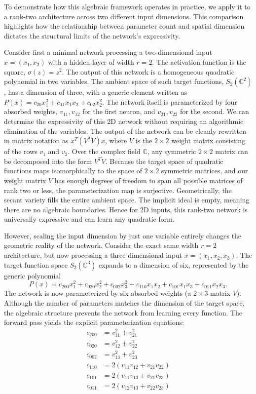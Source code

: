 To demonstrate how this algebraic framework operates in practice, we apply it to a rank-two architecture across two different input dimensions. This comparison highlights how the relationship between parameter count and spatial dimension dictates the structural limits of the network's expressivity.

Consider first a minimal network processing a two-dimensional input $x = (x_1, x_2)$ with a hidden layer of width $r=2$. The activation function is the square, $\sigma(z) = z^2$. The output of this network is a homogeneous quadratic polynomial in two variables. The ambient space of such target functions, $S_2(\mathbb{C}^2)$, has a dimension of three, with a generic element written as $P(x) = c_{20}x_1^2 + c_{11}x_1x_2 + c_{02}x_2^2$. The network itself is parameterized by four absorbed weights, $v_{11}, v_{12}$ for the first neuron, and $v_{21}, v_{22}$ for the second. We can determine the expressivity of this 2D network without requiring an algorithmic elimination of the variables. The output of the network can be cleanly rewritten in matrix notation as $x^T (V^T V) x$, where $V$ is the $2 \times 2$ weight matrix consisting of the rows $v_1$ and $v_2$. Over the complex field $\mathbb{C}$, any symmetric $2 \times 2$ matrix can be decomposed into the form $V^T V$. Because the target space of quadratic functions maps isomorphically to the space of $2 \times 2$ symmetric matrices, and our weight matrix $V$ has enough degrees of freedom to span all possible matrices of rank two or less, the parameterization map is surjective. Geometrically, the secant variety fills the entire ambient space. The implicit ideal is empty, meaning there are no algebraic boundaries. Hence for 2D inputs, this rank-two network is universally expressive and can learn any quadratic form.

However, scaling the input dimension by just one variable entirely changes the geometric reality of the network. Consider the exact same width $r=2$ architecture, but now processing a three-dimensional input $x = (x_1, x_2, x_3)$. The target function space $S_2(\mathbb{C}^3)$ expands to a dimension of six, represented by the generic polynomial
\[
P(x) = c_{200}x_1^2 + c_{020}x_2^2 + c_{002}x_3^2 + c_{110}x_1x_2 + c_{101}x_1x_3 + c_{011}x_2x_3.
\]
The network is now parameterized by six absorbed weights (a $2 \times 3$ matrix $V$). Although the number of parameters matches the dimension of the target space, the algebraic structure prevents the network from learning every function. The forward pass yields the explicit parameterization equations:
\begin{align*}
c_{200} &= v_{11}^2 + v_{21}^2 \\
c_{020} &= v_{12}^2 + v_{22}^2 \\
c_{002} &= v_{13}^2 + v_{23}^2 \\
c_{110} &= 2(v_{11}v_{12} + v_{21}v_{22}) \\
c_{101} &= 2(v_{11}v_{13} + v_{21}v_{23}) \\
c_{011} &= 2(v_{12}v_{13} + v_{22}v_{23})
\end{align*}

